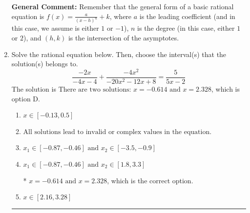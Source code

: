 \documentclass{extbook}[14pt]
\newcommand{\litem}[1]{\item #1

\rule{\textwidth}{0.4pt}}
\begin{document}
\begin{enumerate}
{\textbf{General Comment:} Remember that the general form of a basic rational equation is $ f(x) = \frac{a}{(x-h)^n} + k$, where $a$ is the leading coefficient (and in this case, we assume is either $1$ or $-1$), $n$ is the degree (in this case, either $1$ or $2$), and $(h, k)$ is the intersection of the asymptotes.
}
\litem{
Solve the rational equation below. Then, choose the interval(s) that the solution(s) belongs to.
\[ \frac{-2x}{-4x -4} + \frac{-4x^{2}}{-20x^{2} -12 x + 8} = \frac{5}{5x -2} \]The solution is \( \text{There are two solutions: } x = -0.614 \text{ and } x = 2.328 \), which is option D.\begin{enumerate}[label=\Alph*.]
\item \( x \in [-0.13,0.5] \)


\item \( \text{All solutions lead to invalid or complex values in the equation.} \)


\item \( x_1 \in [-0.87, -0.46] \text{ and } x_2 \in [-3.5,-0.9] \)


\item \( x_1 \in [-0.87, -0.46] \text{ and } x_2 \in [1.8,3.3] \)

* $x = -0.614 \text{ and } x = 2.328$, which is the correct option.
\item \( x \in [2.16,3.28] \)


\end{enumerate}

}
\end{enumerate}
\end{document}
